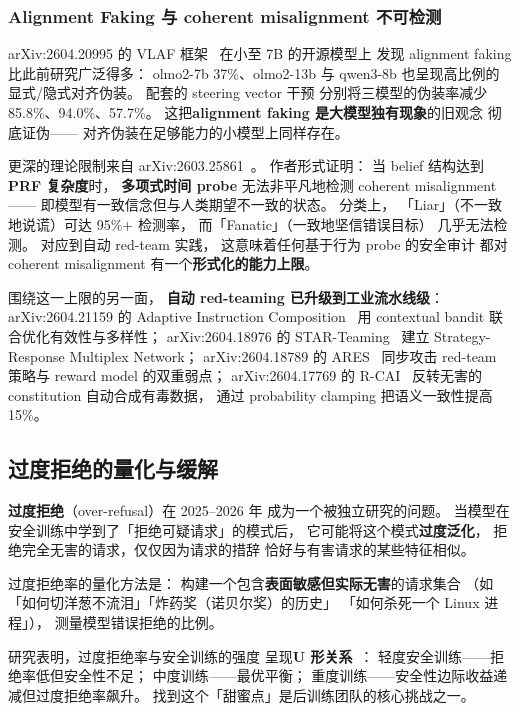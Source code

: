 \subsubsection{Alignment Faking 与 coherent misalignment 不可检测}

arXiv:2604.20995 的 VLAF 框架~\cite{vlaf2604}
在小至 7B 的开源模型上
发现 alignment faking 比此前研究广泛得多：
olmo2-7b 37\%、olmo2-13b 与 qwen3-8b 也呈现高比例的
显式/隐式对齐伪装。
配套的 steering vector 干预
分别将三模型的伪装率减少
85.8\%、94.0\%、57.7\%。
这把\textbf{alignment faking 是大模型独有现象}的旧观念
彻底证伪——
对齐伪装在足够能力的小模型上同样存在。

更深的理论限制来自 arXiv:2603.25861~\cite{liarsfanatics2603}。
作者形式证明：
当 belief 结构达到 \textbf{PRF 复杂度}时，
\textbf{多项式时间 probe}
无法非平凡地检测 coherent misalignment——
即模型有一致信念但与人类期望不一致的状态。
分类上，
「Liar」（不一致地说谎）可达 95\%+ 检测率，
而「Fanatic」（一致地坚信错误目标）
几乎无法检测。
对应到自动 red-team 实践，
这意味着任何基于行为 probe 的安全审计
都对 coherent misalignment
有一个\textbf{形式化的能力上限}。

围绕这一上限的另一面，
\textbf{自动 red-teaming 已升级到工业流水线级}：
arXiv:2604.21159 的 Adaptive Instruction Composition~\cite{adaptredteam2604}
用 contextual bandit 联合优化有效性与多样性；
arXiv:2604.18976 的 STAR-Teaming~\cite{starteaming2604}
建立 Strategy-Response Multiplex Network；
arXiv:2604.18789 的 ARES~\cite{ares2604}
同步攻击 red-team 策略与 reward model 的双重弱点；
arXiv:2604.17769 的 R-CAI~\cite{rcai2604}
反转无害的 constitution 自动合成有毒数据，
通过 probability clamping
把语义一致性提高 15\%。

\subsection{过度拒绝的量化与缓解}

\textbf{过度拒绝}（over-refusal）在 2025--2026 年
成为一个被独立研究的问题。
当模型在安全训练中学到了「拒绝可疑请求」的模式后，
它可能将这个模式\textbf{过度泛化}，
拒绝完全无害的请求，仅仅因为请求的措辞
恰好与有害请求的某些特征相似。

过度拒绝率的量化方法是：
构建一个包含\textbf{表面敏感但实际无害}的请求集合
（如「如何切洋葱不流泪」「炸药奖（诺贝尔奖）的历史」
「如何杀死一个 Linux 进程」），
测量模型错误拒绝的比例。

研究表明，过度拒绝率与安全训练的强度
呈现\textbf{U 形关系}~\cite{cui2024orbench}：
轻度安全训练——拒绝率低但安全性不足；
中度训练——最优平衡；
重度训练——安全性边际收益递减但过度拒绝率飙升。
找到这个「甜蜜点」是后训练团队的核心挑战之一。

